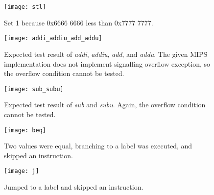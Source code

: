 \begin{figure}[htbp]
   \centering
   \texttt{[image: stl]}
   \caption{Set 1 because 0x6666 6666 less than 0x7777 7777.}
\end{figure}

\begin{figure}[htbp]
   \centering
   \texttt{[image: addi\_addiu\_add\_addu]}
   \caption{Expected test result of \textit{addi}, \textit{addiu}, \textit{add}, and \textit{addu}. The given MIPS implementation does not implement signalling overflow exception, so the overflow condition cannot be tested.}
\end{figure}

\begin{figure}[htbp]
   \centering
   \texttt{[image: sub\_subu]}
   \caption{Expected test result of \textit{sub} and \textit{subu}. Again, the overflow condition cannot be tested.}
\end{figure}

\begin{figure}[htbp]
   \centering
   \texttt{[image: beq]}
   \caption{Two values were equal, branching to a label was executed, and skipped an instruction.}
\end{figure}

\begin{figure}[htbp]
   \centering
   \texttt{[image: j]}
   \caption{Jumped to a label and skipped an instruction.}
\end{figure}
